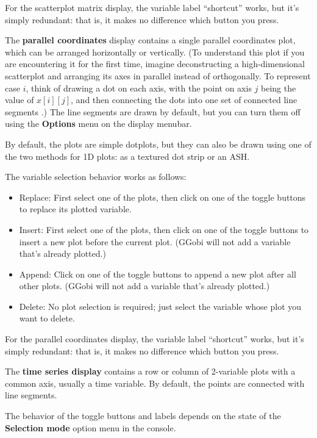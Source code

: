 \documentclass[11pt]{article}
\begin{document}
For the scatterplot matrix display, the variable label ``shortcut''
works, but it's simply redundant: that is, it makes no difference which
button you press.


The {\bf parallel coordinates} display contains a single parallel
coordinates plot, which can be arranged horizontally or vertically.
(To understand this plot if you are encountering it for the first
time, imagine deconstructing a high-dimensional scatterplot and
arranging its axes in parallel instead of orthogonally.  To represent
case $i$, think of drawing a dot on each axis,  with the point on
axis $j$ being the value of $x[i][j]$, and then connecting the dots
into one set of connected line segments \cite{In85,We90}.)  The line
segments are drawn by default, but you can turn them off using the
{\bf Options} menu on the display menubar.

By default, the plots are simple dotplots, but they can also be drawn
using one of the two methods for 1D plots:  as a textured dot
strip or an ASH.

The variable selection behavior works as follows:

\begin{itemize}
\item Replace:  First select one of the plots, then click on one
  of the toggle buttons to replace its plotted variable.
\item Insert:  First select one of the plots, then click on
  one of the toggle buttons to insert a new plot before
  the current plot.  (GGobi will not add a variable that's
  already plotted.)
\item Append:  Click on one of the toggle buttons to append
  a new plot after all other plots.  (GGobi will not add a variable
  that's already plotted.)
\item Delete:  No plot selection is required; just select the
  variable whose plot you want to delete.
\end{itemize}

For the parallel coordinates display, the variable label ``shortcut''
works, but it's simply redundant: that is, it makes no difference which
button you press.


The {\bf time series display} contains a row or column of 2-variable
plots with a common axis, usually a time variable.  By default, the
points are connected with line segments.  

The behavior of the toggle buttons and labels depends on the state of the
{\bf Selection mode} option menu in the console.
\end{document}
